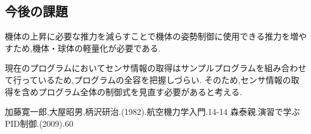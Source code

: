 \documentclass[twocolumn,11pt]{sotsuken_abst}
\begin{document}
\subsection{今後の課題}
機体の上昇に必要な推力を減らすことで機体の姿勢制御に使用できる推力を増やすため,機体・球体の軽量化が必要である.

現在のプログラムにおいてセンサ情報の取得はサンプルプログラムを組み合わせて行っているため,プログラムの全容を把握しづらい.
そのため,センサ情報の取得を含めプログラム全体の制御式を見直す必要があると考える.

\begin{thebibliography}{8}
 加藤寛一郎,大屋昭男,柄沢研治.(1982).航空機力学入門.14-14
 森泰親.演習で学ぶPID制御.(2009).60
\end{thebibliography}

\end{document}
